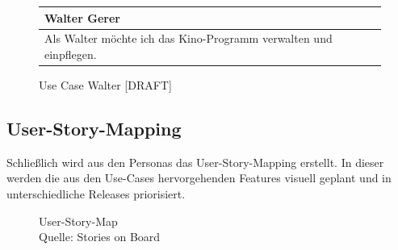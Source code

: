 		\begin{figure}[H]
			\begin{tabular}{p{13cm}}
				\textbf{Walter Gerer} \\\toprule
				Als Walter möchte ich das Kino-Programm verwalten und einpflegen. 
			\end{tabular}
			\caption[Use Case Walter]{\label{fig:useCaseWalter} Use Case Walter [DRAFT]}
		\end{figure}
		
	\subsection{User-Story-Mapping}
	Schließlich wird aus den Personas das User-Story-Mapping erstellt. In dieser werden die aus den Use-Cases hervorgehenden Features visuell geplant und in unterschiedliche Releases priorisiert. 

	\begin{figure}[H]
		\caption[User-Story-Map ]{\label{fig:userStoryMap}User-Story-Map\\ Quelle: Stories on Board}
	\end{figure} 
	 	
